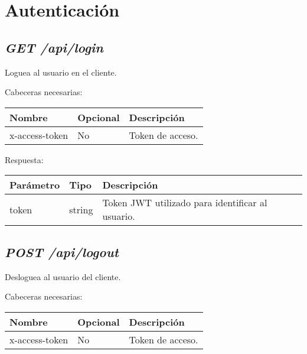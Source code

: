 \section{Autenticación}

\subsection{\textit{GET /api/login}}
Loguea al usuario en el cliente.

Cabeceras necesarias:
\begin{table}[h!]
	\centering
	\begin{adjustbox}{max width=\textwidth}
	\begin{tabular}{|l|l|l|}
		\hline
		Nombre & Opcional & Descripción \\ \hline
		x-access-token & No & Token de acceso. \\ \hline
	\end{tabular}
\end{adjustbox}
\end{table}


Respuesta:
\begin{table}[h!]
	\centering
	\begin{adjustbox}{max width=\textwidth}
	\begin{tabular}{|l|l|l|}
		\hline
		Parámetro & Tipo & Descripción \\ \hline
		token & string & Token JWT utilizado para identificar al usuario. \\ \hline
	\end{tabular}
\end{adjustbox}
\end{table}



\subsection{\textit{POST /api/logout}}

Desloguea al usuario del cliente.

\bigskip
Cabeceras necesarias:

\begin{table}[h!]
	\centering
\begin{adjustbox}{max width=\textwidth}
	\begin{tabular}{|l|l|l|}
		\hline
		Nombre & Opcional & Descripción \\ \hline
		x-access-token & No & Token de acceso. \\ \hline
	\end{tabular}
\end{adjustbox}
\end{table}


